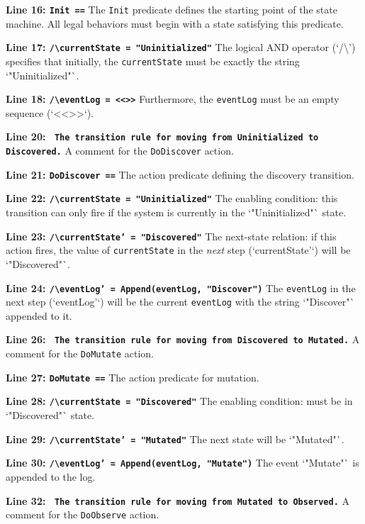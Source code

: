 \textbf{Line 16: \texttt{Init ==}}
The \texttt{Init} predicate defines the starting point of the state machine. All legal behaviors must begin with a state satisfying this predicate.

\textbf{Line 17: \texttt{/\textbackslash currentState = "Uninitialized"}}
The logical AND operator (`/\textbackslash') specifies that initially, the \texttt{currentState} must be exactly the string `"Uninitialized"`.

\textbf{Line 18: \texttt{/\textbackslash eventLog = <<>>}}
Furthermore, the \texttt{eventLog} must be an empty sequence (`<<>>`).

\textbf{Line 20: \texttt{\* The transition rule for moving from Uninitialized to Discovered.}}
A comment for the \texttt{DoDiscover} action.

\textbf{Line 21: \texttt{DoDiscover ==}}
The action predicate defining the discovery transition.

\textbf{Line 22: \texttt{/\textbackslash currentState = "Uninitialized"}}
The enabling condition: this transition can only fire if the system is currently in the `"Uninitialized"` state.

\textbf{Line 23: \texttt{/\textbackslash currentState' = "Discovered"}}
The next-state relation: if this action fires, the value of \texttt{currentState} in the \textit{next} step (`currentState'`) will be `"Discovered"`.

\textbf{Line 24: \texttt{/\textbackslash eventLog' = Append(eventLog, "Discover")}}
The \texttt{eventLog} in the next step (`eventLog'`) will be the current \texttt{eventLog} with the string `"Discover"` appended to it.

\textbf{Line 26: \texttt{\* The transition rule for moving from Discovered to Mutated.}}
A comment for the \texttt{DoMutate} action.

\textbf{Line 27: \texttt{DoMutate ==}}
The action predicate for mutation.

\textbf{Line 28: \texttt{/\textbackslash currentState = "Discovered"}}
The enabling condition: must be in `"Discovered"` state.

\textbf{Line 29: \texttt{/\textbackslash currentState' = "Mutated"}}
The next state will be `"Mutated"`.

\textbf{Line 30: \texttt{/\textbackslash eventLog' = Append(eventLog, "Mutate")}}
The event `"Mutate"` is appended to the log.

\textbf{Line 32: \texttt{\* The transition rule for moving from Mutated to Observed.}}
A comment for the \texttt{DoObserve} action.

